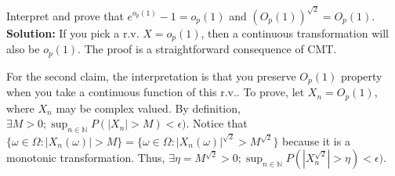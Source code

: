 \documentclass[11pt,letterpaper]{article}                  %
\begin{document}
\bigskip
\begin{problem}
Interpret and prove that $e^{o_p(1)} -1 = o_p(1)$ and $(O_p(1))^{\sqrt{2}} = O_p(1)$. \\

\textbf{Solution:} If you pick a r.v. $X = o_p(1)$, then a continuous transformation will also be $o_p(1)$. The proof is a straightforward consequence of CMT.

For the second claim, the interpretation is that you preserve $O_p(1)$
property when you take a continuous function of this r.v.. To prove,
let $X_n = O_p(1)$, where $X_n$ may be complex valued. By definition, $\exists M>0 ; \sup_{n \in \mathbb{N}} P(|X_n|>M)<\epsilon)$. Notice that $\{\omega \in \Omega : |X_n(\omega)|>M\} = \{\omega \in \Omega : |X_n(\omega)|^{\sqrt{2}}>M^{\sqrt{2}}\}$ because it is a monotonic transformation. Thus, $\exists \eta = M^{\sqrt{2}}>0 ; \sup_{n \in \mathbb{N}} P(|X_n^{\sqrt{2}}|>\eta)<\epsilon)$.
\end{problem}
\end{document}
